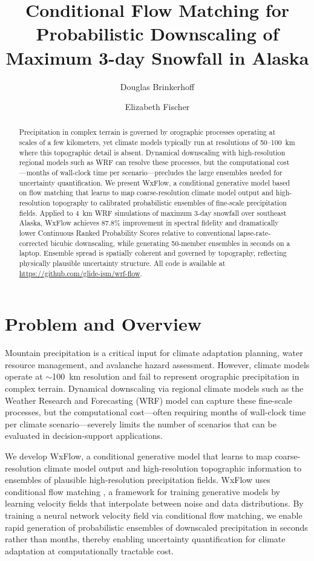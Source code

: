 \documentclass[11pt]{article}
\author[1]{Douglas Brinkerhoff}
\author[2]{Elizabeth Fischer}
\affil[1]{Department of Computer Science, University of Montana}
\affil[2]{International Arctic Research Center, University of Alaska}
\title{Conditional Flow Matching for Probabilistic Downscaling of Maximum 3-day Snowfall in Alaska}
\begin{document}
\maketitle

\begin{abstract}
Precipitation in complex terrain is governed by orographic processes operating at scales of a few kilometers, yet climate models typically run at resolutions of 50--100~km where this topographic detail is absent. Dynamical downscaling with high-resolution regional models such as WRF can resolve these processes, but the computational cost---months of wall-clock time per scenario---precludes the large ensembles needed for uncertainty quantification. We present WxFlow, a conditional generative model based on flow matching that learns to map coarse-resolution climate model output and high-resolution topography to calibrated probabilistic ensembles of fine-scale precipitation fields. Applied to 4~km WRF simulations of maximum 3-day snowfall over southeast Alaska, WxFlow achieves 87.8\% improvement in spectral fidelity and dramatically lower Continuous Ranked Probability Scores relative to conventional lapse-rate-corrected bicubic downscaling, while generating 50-member ensembles in seconds on a laptop. Ensemble spread is spatially coherent and governed by topography, reflecting physically plausible uncertainty structure. All code is available at \url{https://github.com/glide-ism/wrf-flow}.
\end{abstract}

\section{Problem and Overview}

Mountain precipitation is a critical input for climate adaptation planning, water resource management, and avalanche hazard assessment. However, climate models operate at $\sim$100~km resolution and fail to represent orographic precipitation in complex terrain. Dynamical downscaling via regional climate models such as the Weather Research and Forecasting (WRF) model \citep{skamarock2019} can capture these fine-scale processes, but the computational cost---often requiring months of wall-clock time per climate scenario---severely limits the number of scenarios that can be evaluated in decision-support applications.

We develop WxFlow, a conditional generative model that learns to map coarse-resolution climate model output and high-resolution topographic information to ensembles of plausible high-resolution precipitation fields. WxFlow uses conditional flow matching \citep[CFM;][]{lipman2023}, a framework for training generative models by learning velocity fields that interpolate between noise and data distributions.  By training a neural network velocity field via conditional flow matching, we enable rapid generation of probabilistic ensembles of downscaled precipitation in seconds rather than months, thereby enabling uncertainty quantification for climate adaptation at computationally tractable cost.  
\end{document}
